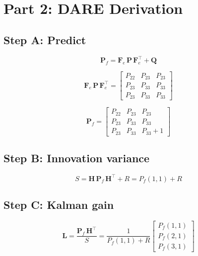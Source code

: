 \documentclass[11pt]{article}
\newcommand{\Fe}{\mathbf{F}_e}
\newcommand{\Hm}{\mathbf{H}}
\newcommand{\Qm}{\mathbf{Q}}
\newcommand{\Pf}{\mathbf{P}_f}
\newcommand{\Pm}{\mathbf{P}}
\newcommand{\Lm}{\mathbf{L}}
\begin{document}
\section*{Part 2: DARE Derivation}

\subsection*{Step A: Predict}
\begin{equation}
\Pf = \Fe\,\Pm\,\Fe^\top + \Qm \tag{A}
\end{equation}

\begin{equation}
\Fe\,\Pm\,\Fe^\top = \begin{bmatrix}
P_{22} & P_{23} & P_{23} \\
P_{23} & P_{33} & P_{33} \\
P_{23} & P_{33} & P_{33}
\end{bmatrix}
\end{equation}

\begin{equation}
\Pf = \begin{bmatrix}
P_{22} & P_{23} & P_{23} \\
P_{23} & P_{33} & P_{33} \\
P_{23} & P_{33} & P_{33}+1
\end{bmatrix} \tag{A'}
\end{equation}

\subsection*{Step B: Innovation variance}
\begin{equation}
S = \Hm\,\Pf\,\Hm^\top + R = P_f(1,1) + R \tag{B}
\end{equation}

\subsection*{Step C: Kalman gain}
\begin{equation}
\Lm = \frac{\Pf\,\Hm^\top}{S} = \frac{1}{P_f(1,1)+R}\begin{bmatrix} P_f(1,1) \\ P_f(2,1) \\ P_f(3,1) \end{bmatrix} \tag{C}
\end{equation}
\end{document}
